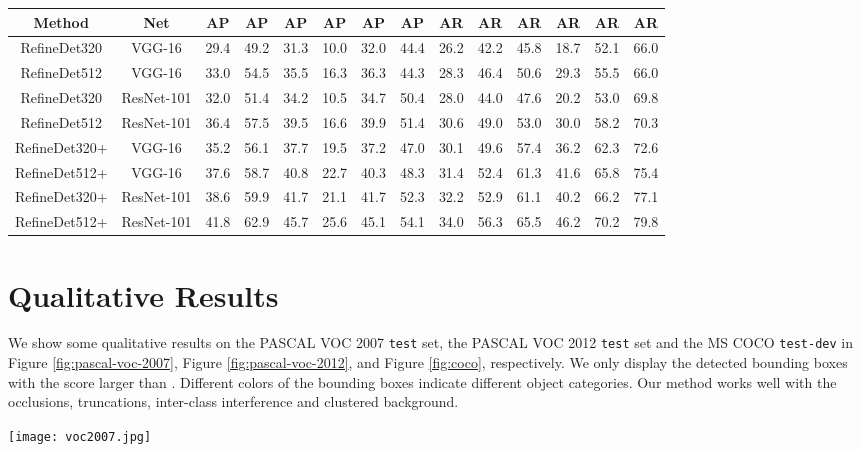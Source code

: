 \documentclass[10pt,twocolumn,letterpaper]{article}
\begin{document}
\begin{table*}
\centering
\caption{Object detection results on the MS COCO {\tt test-dev} set.}
\vspace{-2mm}
\footnotesize \setlength{\tabcolsep}{7.0pt}
\begin{threeparttable}
\begin{tabular}{c|c|ccc|ccc|ccc|ccc}
\toprule[1.5pt]
Method &Net &AP &AP &AP &AP &AP &AP &AR &AR &AR &AR &AR &AR\\
\hline
RefineDet320 &VGG-16 &29.4 &49.2 &31.3 &10.0 &32.0 &44.4 &26.2 &42.2 &45.8 &18.7 &52.1 &66.0\\
RefineDet512 &VGG-16 &33.0 &54.5 &35.5 &16.3 &36.3 &44.3 &28.3 &46.4 &50.6 &29.3 &55.5 &66.0 \\
RefineDet320 &ResNet-101 &32.0 &51.4 &34.2 &10.5 &34.7 &50.4 &28.0 &44.0 &47.6 &20.2 &53.0 &69.8 \\
RefineDet512 &ResNet-101 &36.4 &57.5 &39.5 &16.6 &39.9 &51.4 &30.6 &49.0 &53.0 &30.0 &58.2 &70.3 \\
RefineDet320+ &VGG-16 &35.2 &56.1 &37.7 &19.5 &37.2 &47.0 &30.1 &49.6 &57.4 &36.2 &62.3 &72.6 \\
RefineDet512+ &VGG-16 &37.6 &58.7 &40.8 &22.7 &40.3 &48.3 &31.4 &52.4 &61.3 &41.6 &65.8 &75.4\\
RefineDet320+ &ResNet-101 &38.6 &59.9 &41.7 &21.1 &41.7 &52.3 &32.2 &52.9 &61.1 &40.2 &66.2 &77.1 \\
RefineDet512+ &ResNet-101 &41.8 &62.9 &45.7 &25.6 &45.1 &54.1 &34.0 &56.3 &65.5 &46.2 &70.2 &79.8 \\
\bottomrule[1.5pt]
\end{tabular}
\end{threeparttable}
\label{tab:coco}
\end{table*}


\section{Qualitative Results}
We show some qualitative results on the PASCAL VOC 2007 {\tt test} set, the PASCAL VOC 2012 {\tt test} set and the MS COCO {\tt test-dev} in Figure \ref{fig:pascal-voc-2007}, Figure \ref{fig:pascal-voc-2012}, and Figure \ref{fig:coco}, respectively. We only display the detected bounding boxes with the score larger than . Different colors of the bounding boxes indicate different object categories. Our method works well with the occlusions, truncations, inter-class interference and clustered background.

\begin{figure*}
\centering
\texttt{[image: voc2007.jpg]}
\caption{Qualitative results of RefineDet512 on the PASCAL VOC 2007 {\tt test} set (corresponding to  mAP). VGG-16 is used as the backbone network. The training data is 07+12+COCO.}
\label{fig:pascal-voc-2007}
\end{figure*}
\end{document}
